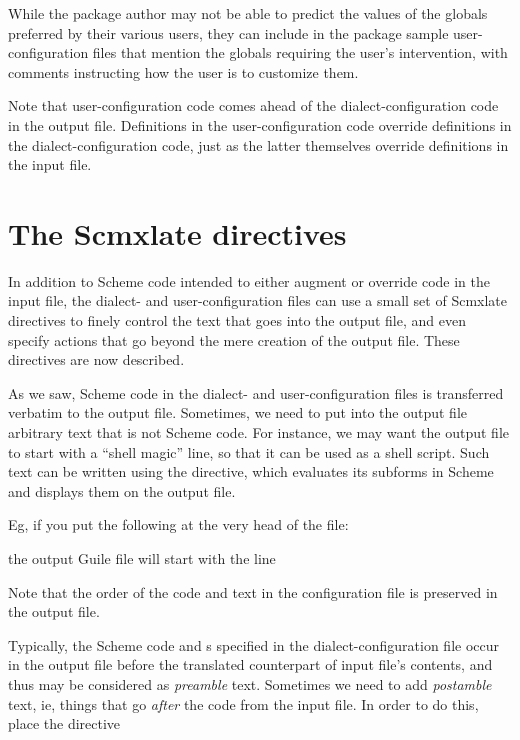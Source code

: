 While the package author may not be able to predict the
values of the globals preferred by their various
users, they can include in the package sample
user-configuration files that mention the globals
requiring the user's intervention, with comments
instructing how the user is to customize them.

Note that user-configuration code comes ahead of the
dialect-configuration code in the output file.
Definitions in the user-configuration code override
definitions in the dialect-configuration code, just
as the latter themselves override definitions in the
input file.

\section{The Scmxlate directives}
\label{glossary}

In addition to Scheme code intended to either augment
or override code in the input file, the
dialect- and user-configuration files can
use a small set of Scmxlate directives to finely control
the text that goes into the output file, and even
specify actions that go beyond the mere creation
of the output file.  These directives are now described.


As we saw, Scheme code in the dialect- and
user-configuration files is transferred verbatim
to the output file.  Sometimes, we need to put into the
output file arbitrary text that is not Scheme code.
For instance, we may want the output file to start with
a ``shell magic'' line, so that it can be used as a
shell script.  Such text can be written using the
 directive, which evaluates its
subforms in Scheme and displays them on the output
file.

Eg, if you put the following at
the very head of the  file:


\n the output Guile file  will start with the
line


Note that the order of the code and 
text in the configuration file is preserved in
the output file.


Typically, the Scheme code and s
specified in the dialect-configuration file occur in
the output file before the translated counterpart of
input file's contents, and thus may be considered as
{\em preamble} text.   Sometimes we need to add {\em
postamble} text, ie, things that go {\em after} the
code from the input file.  In order to do this,
place the directive


